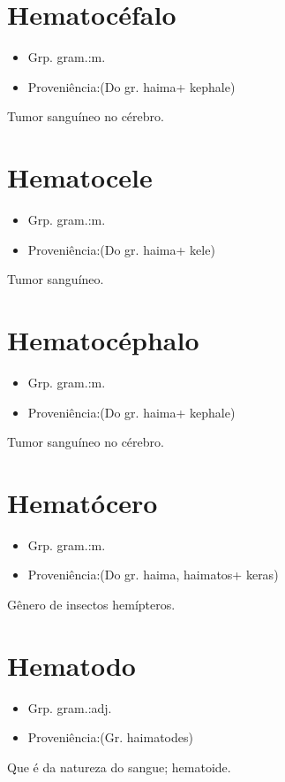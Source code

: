 \documentclass{article}
\begin{document}
\section{Hematocéfalo}
\begin{itemize}
\item {Grp. gram.:m.}
\end{itemize}
\begin{itemize}
\item {Proveniência:(Do gr. \textunderscore haima\textunderscore  + \textunderscore kephale\textunderscore )}
\end{itemize}
Tumor sanguíneo no cérebro.
\section{Hematocele}
\begin{itemize}
\item {Grp. gram.:m.}
\end{itemize}
\begin{itemize}
\item {Proveniência:(Do gr. \textunderscore haima\textunderscore  + \textunderscore kele\textunderscore )}
\end{itemize}
Tumor sanguíneo.
\section{Hematocéphalo}
\begin{itemize}
\item {Grp. gram.:m.}
\end{itemize}
\begin{itemize}
\item {Proveniência:(Do gr. \textunderscore haima\textunderscore  + \textunderscore kephale\textunderscore )}
\end{itemize}
Tumor sanguíneo no cérebro.
\section{Hematócero}
\begin{itemize}
\item {Grp. gram.:m.}
\end{itemize}
\begin{itemize}
\item {Proveniência:(Do gr. \textunderscore haima\textunderscore , \textunderscore haimatos\textunderscore  + \textunderscore keras\textunderscore )}
\end{itemize}
Gênero de insectos hemípteros.
\section{Hematodo}
\begin{itemize}
\item {Grp. gram.:adj.}
\end{itemize}
\begin{itemize}
\item {Proveniência:(Gr. \textunderscore haimatodes\textunderscore )}
\end{itemize}
Que é da natureza do sangue; hematoide.
\end{document}
